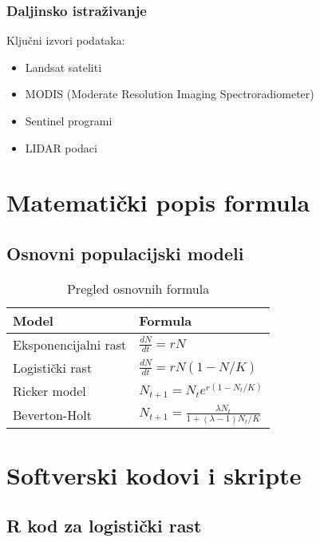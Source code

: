 \documentclass[12pt,a4paper,twoside]{book}
\begin{document}
	\subsection{Daljinsko istraživanje}
	Ključni izvori podataka:
	\begin{itemize}
		\item Landsat sateliti
		\item MODIS (Moderate Resolution Imaging Spectroradiometer)
		\item Sentinel programi
		\item LIDAR podaci
	\end{itemize}
	
	\appendix
	
	\chapter{Matematički popis formula}
	
	\section{Osnovni populacijski modeli}
	
	\begin{table}[H]
		\centering
		\caption{Pregled osnovnih formula}
		\begin{tabular}{@{}ll@{}}
			\toprule
			Model & Formula \\
			\midrule
			Eksponencijalni rast & $\frac{dN}{dt} = rN$ \\
			Logistički rast & $\frac{dN}{dt} = rN(1-N/K)$ \\
			Ricker model & $N_{t+1} = N_t e^{r(1-N_t/K)}$ \\
			Beverton-Holt & $N_{t+1} = \frac{\lambda N_t}{1 + (\lambda-1)N_t/K}$ \\
			\bottomrule
		\end{tabular}
	\end{table}
	
	\chapter{Softverski kodovi i skripte}
	
	\section{R kod za logistički rast}
	
\end{document}
